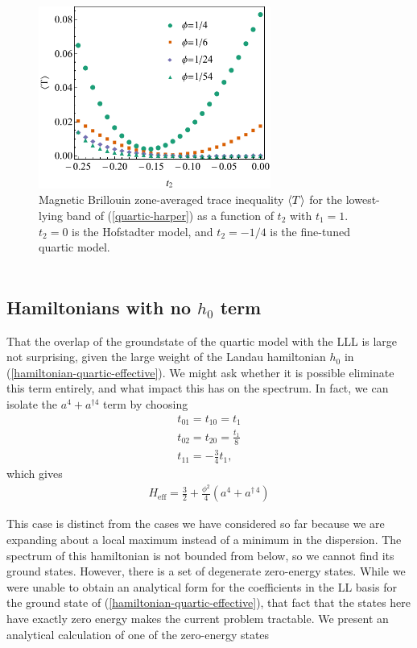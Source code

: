 \documentclass[aps,prb,twocolumn,letterpaper,twoside,nobalancelastpage,groupedaddress,amsmath,amssymb,floatfix,citeautoscript]{revtex4-1}
\begin{document}
\begin{figure}[thb]
\centering
\includegraphics[width=3.0in]{trace-delta-plot-new.pdf}
\caption{\label{trace-delta-plot}Magnetic Brillouin zone-averaged trace inequality $\expval{T}$ for the lowest-lying band of (\ref{quartic-harper}) as a function of $t_2$ with $t_1 = 1$. $t_2 = 0$ is the Hofstadter model, and $t_2 = -1/4$ is the fine-tuned quartic model.}
\end{figure}
\begin{align*}
\end{align*}

\subsection{Hamiltonians with no $h_0$ term}
That the overlap of the groundstate of the quartic model with the LLL is large not surprising, given the large weight of the Landau hamiltonian $h_0$ in (\ref{hamiltonian-quartic-effective}). We might ask whether it is possible eliminate this term entirely, and what impact this has on the spectrum. In fact, we can isolate the $a^4 + a^{\dag 4}$ term by choosing
\begin{align*}
t_{01} = t_{10} = t_1\\
t_{02} = t_{20} = \frac{t_1}{8} \\
t_{11} = - \frac{3}{4}t_1, 
\end{align*}
which gives
\begin{align*}
H_{\text{eff}} = \frac{3}{2} + \frac{\phi^2}{4}(a^4 + a^{\dag\,4})
\end{align*}

This case is distinct from the cases we have considered so far because we are expanding about a local maximum instead of a minimum in the dispersion. The spectrum of this hamiltonian is not bounded from below, so we cannot find its ground states. However, there is a set of degenerate zero-energy states. While we were unable to obtain an analytical form for the coefficients in the LL basis for the ground state of (\ref{hamiltonian-quartic-effective}), that fact that the states here have exactly zero energy makes the current problem tractable. We present an analytical calculation of one of the zero-energy states 
\end{document}
